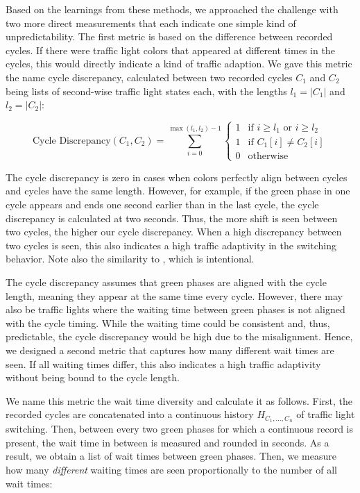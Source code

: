 Based on the learnings from these methods, we approached the challenge with two more direct measurements that each indicate one simple kind of unpredictability. The first metric is based on the difference between recorded cycles. If there were traffic light colors that appeared at different times in the cycles, this would directly indicate a kind of traffic adaption. We gave this metric the name cycle discrepancy, calculated between two recorded cycles $C_1$ and $C_2$ being lists of second-wise traffic light states each, with the lengths $l_1 = |C_1|$ and $l_2 = |C_2|$:

\begin{equation} \text{Cycle Discrepancy}(C_1, C_2) =  \sum_{i=0}^{\max(l_1, l_2)-1} \left\{
\begin{array}{ll}
1 & \text{if } i \geq l_1 \text{ or } i \geq l_2 \\
1 & \text{if } C_1[i] \neq C_2[i] \\
0 & \text{otherwise}
\end{array} \right.\end{equation}

The cycle discrepancy is zero in cases when colors perfectly align between cycles and cycles have the same length. However, for example, if the green phase in one cycle appears and ends one second earlier than in the last cycle, the cycle discrepancy is calculated at two seconds. Thus, the more shift is seen between two cycles, the higher our cycle discrepancy. When a high discrepancy between two cycles is seen, this also indicates a high traffic adaptivity in the switching behavior. Note also the similarity to , which is intentional.

The cycle discrepancy assumes that green phases are aligned with the cycle length, meaning they appear at the same time every cycle. However, there may also be traffic lights where the waiting time between green phases is not aligned with the cycle timing. While the waiting time could be consistent and, thus, predictable, the cycle discrepancy would be high due to the misalignment. Hence, we designed a second metric that captures how many different wait times are seen. If all waiting times differ, this also indicates a high traffic adaptivity without being bound to the cycle length.

We name this metric the wait time diversity and calculate it as follows. First, the recorded cycles are concatenated into a continuous history $H_{C_1, \dots, C_n}$ of traffic light switching. Then, between every two green phases for which a continuous record is present, the wait time in between is measured and rounded in seconds. As a result, we obtain a list of wait times between green phases. Then, we measure how many \textit{different} waiting times are seen proportionally to the number of all wait times:


